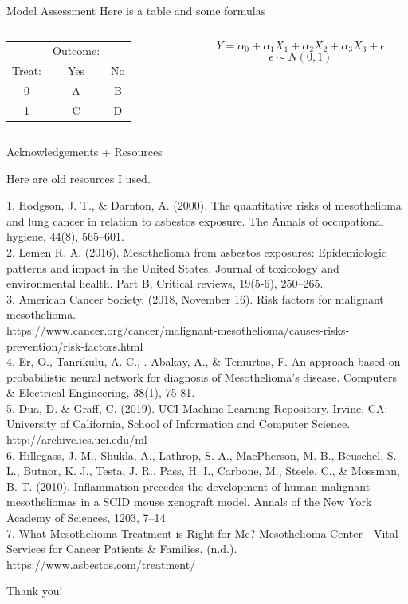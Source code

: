 \documentclass{beamer}
\begin{document}
\begin{frame}{Model Assessment}
   Here is a table and some formulas 
   \bigskip 
   \begin{columns}
        \begin{column}{0.45\textwidth}
        	\begin{tabular}{|c|cc|} \hline
            	&Outcome:& \\
          		Treat:  & Yes & No \\ \hline 
           		0& A & B  \\
           		1 & C & D \\ \hline 
        	\end{tabular}
        \end{column}
        \begin{column}{0.55\textwidth}
        	$$Y = \alpha_0 + \alpha_1 X_1 + \alpha_2 X_2 + \alpha_3 X_3 + \epsilon$$
        	$$\epsilon \sim N(0,1)$$
        \end{column}
   \end{columns}
\end{frame}


\begin{frame}{Acknowledgements + Resources}
\begin{center}
    Here are old resources I used.  
\end{center}
\medskip  
\scriptsize{ 1. Hodgson, J. T., \& Darnton, A. (2000). The quantitative risks of mesothelioma and lung cancer in relation to asbestos exposure. The Annals of occupational hygiene, 44(8), 565–601. \\
2. Lemen R. A. (2016). Mesothelioma from asbestos exposures: Epidemiologic patterns and impact in the United States. Journal of toxicology and environmental health. Part B, Critical reviews, 19(5-6), 250–265. \\
3. American Cancer Society. (2018, November 16). Risk factors for malignant mesothelioma.  \\ https://www.cancer.org/cancer/malignant-mesothelioma/causes-risks-prevention/risk-factors.html \\
4. Er, O., Tanrikulu, A. C., . Abakay, A., \& Temurtas, F. An approach based on probabilistic neural network for diagnosis of Mesothelioma's disease. Computers \& Electrical Engineering, 38(1), 75-81. \\
5. Dua, D. \& Graff, C. (2019). UCI Machine Learning Repository. Irvine, CA: University of California, School of Information and Computer Science.  http://archive.ics.uci.edu/ml \\
6. Hillegass, J. M., Shukla, A., Lathrop, S. A., MacPherson, M. B., Beuschel, S. L., Butnor, K. J., Testa, J. R., Pass, H. I., Carbone, M., Steele, C., \& Mossman, B. T. (2010). Inflammation precedes the development of human malignant mesotheliomas in a SCID mouse xenograft model. Annals of the New York Academy of Sciences, 1203, 7–14. \\
7. What Mesothelioma Treatment is Right for Me? Mesothelioma Center - Vital Services for Cancer Patients \& Families. (n.d.). https://www.asbestos.com/treatment/ }
\end{frame}

\begin{frame}{Thank you!}
\end{frame}
\end{document}
